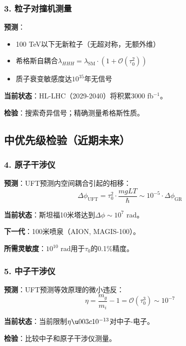\subsubsection{3. 粒子对撞机测量}

\begin{test}[LHC高亮度运行]
\textbf{预测}：
\begin{itemize}
    \item 100 TeV以下无新粒子（无超对称，无额外维）
    \item 希格斯自耦合$\lambda_{HHH} = \lambda_{\text{SM}} \cdot (1 + \mathcal{O}(\tau_0^2))$
    \item 质子衰变敏感度达$10^{35}$年无信号
\end{itemize}

\textbf{当前状态}：HL-LHC（2029-2040）将积累3000 fb$^{-1}$。

\textbf{检验}：搜索奇异信号；精确测量希格斯性质。
\end{test}

\subsection{中优先级检验（近期未来）}

\subsubsection{4. 原子干涉仪}

\begin{test}[大动量转移原子干涉仪]
\textbf{预测}：UFT预测内空间耦合引起的相移：
\begin{equation}
    \Delta \phi_{\text{UFT}} = \tau_0^2 \cdot \frac{m g L T}{\hbar} \sim 10^{-5} \cdot \Delta \phi_{\text{GR}}
\end{equation}

\textbf{当前状态}：斯坦福10米塔达到$\Delta\phi \sim 10^7$ rad。

\textbf{下一代}：100米喷泉（AION, MAGIS-100）。

\textbf{所需灵敏度}：$10^{10}$ rad用于$\tau_0$的0.1\%精度。
\end{test}

\subsubsection{5. 中子干涉仪}

\begin{test}[完美晶体中子干涉仪]
\textbf{预测}：UFT预测等效原理的微小违反：
\begin{equation}
    \eta = \frac{m_g}{m_i} - 1 = \mathcal{O}(\tau_0^3) \sim 10^{-7}
\end{equation}

\textbf{当前状态}：当前限制$\eta \u003c 10^{-13}$对中子-电子。

\textbf{检验}：比较中子和原子干涉仪测量。
\end{test}

